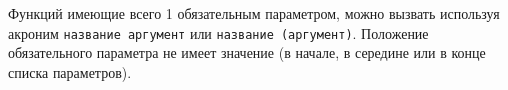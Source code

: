 \begin{sourcecode}
	\label{defaultparametrs}
	\inputminted[linenos]{icl}{../sources/defaultparametrs.icL}
\end{sourcecode}

Функций имеющие всего 1 обязательным параметром, можно вызвать используя акроним \texttt{название аргумент} или \texttt{название (аргумент)}. Положение обязательного параметра не имеет значение (в начале, в середине или в конце списка параметров).

